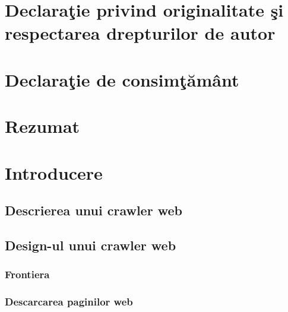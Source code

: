 \documentclass[12pt,oneside]{report}
\newcommand{\chaptertitle}[1]{\LARGE{#1}}
\begin{document}

\chapter*{
	\large{
		Declara\c{t}ie privind originalitate \c{s}i respectarea drepturilor de autor
	}
}



\chapter*{
	\large{
		Declara\c{t}ie de consim\c{t}\u{a}m\^{a}nt
	}
}



\chapter*{\chaptertitle{Rezumat}}

\newpage



\tableofcontents
\clearpage

\chapter*{\chaptertitle{Introducere}}

\clearpage

\section{Descrierea unui crawler web}


\section{Design-ul unui crawler web}


\subsection{Frontiera}


\subsection{Descarcarea paginilor web}

\end{document}
